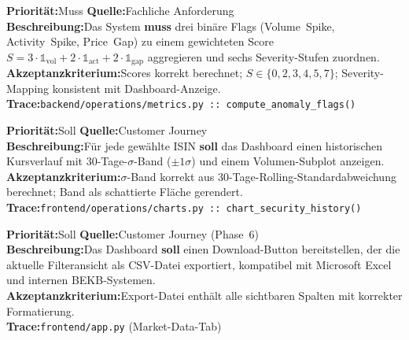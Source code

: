 \documentclass[11pt, a4paper, oneside, openany]{report}
\newcommand{\code}[1]{\texttt{\small\textcolor{DeepNavy}{#1}}}
\begin{document}
\vspace{6pt}

\begin{reqbox}
\textbf{Priorität:}\;Muss \quad \textbf{Quelle:}\;Fachliche Anforderung \\[4pt]
\textbf{Beschreibung:}\;Das System \textbf{muss} drei binäre Flags (Volume~Spike, Activity~Spike, Price~Gap) zu einem gewichteten Score $S = 3 \cdot \mathbb{1}_\text{vol} + 2 \cdot \mathbb{1}_\text{act} + 2 \cdot \mathbb{1}_\text{gap}$ aggregieren und sechs Severity-Stufen zuordnen. \\[4pt]
\textbf{Akzeptanzkriterium:}\;Scores korrekt berechnet; $S \in \{0,2,3,4,5,7\}$; Severity-Mapping konsistent mit Dashboard-Anzeige. \\[4pt]
\textbf{Trace:}\;\code{backend/operations/metrics.py :: compute\_anomaly\_flags()}
\end{reqbox}

\vspace{6pt}

\begin{reqbox}
\textbf{Priorität:}\;Soll \quad \textbf{Quelle:}\;Customer Journey \\[4pt]
\textbf{Beschreibung:}\;Für jede gewählte ISIN \textbf{soll} das Dashboard einen historischen Kursverlauf mit 30-Tage-$\sigma$-Band ($\pm 1\sigma$) und einem Volumen-Subplot anzeigen. \\[4pt]
\textbf{Akzeptanzkriterium:}\;$\sigma$-Band korrekt aus 30-Tage-Rolling-Standardabweichung berechnet; Band als schattierte Fläche gerendert. \\[4pt]
\textbf{Trace:}\;\code{frontend/operations/charts.py :: chart\_security\_history()}
\end{reqbox}

\vspace{6pt}

\begin{reqbox}
\textbf{Priorität:}\;Soll \quad \textbf{Quelle:}\;Customer Journey (Phase~6) \\[4pt]
\textbf{Beschreibung:}\;Das Dashboard \textbf{soll} einen Download-Button bereitstellen, der die aktuelle Filteransicht als CSV-Datei exportiert, kompatibel mit Microsoft Excel und internen BEKB-Systemen. \\[4pt]
\textbf{Akzeptanzkriterium:}\;Export-Datei enthält alle sichtbaren Spalten mit korrekter Formatierung. \\[4pt]
\textbf{Trace:}\;\code{frontend/app.py} (Market-Data-Tab)
\end{reqbox}
\end{document}
